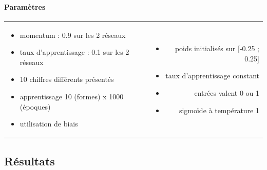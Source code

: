     \paragraph{Paramètres}
      \begin{center}
	\begin{tabular}{lr}
	  \begin{minipage}{230px}
	    \begin{itemize}
	      \item momentum : 0.9 sur les 2 réseaux
	      \item taux d'apprentissage : 0.1 sur les 2 réseaux
	      \item 10 chiffres différents présentés
	      \item apprentissage 10 (formes) x 1000 (époques)
	      \item utilisation de biais
	    \end{itemize}
	  \end{minipage}
	  &
	  \begin{minipage}{230px}
	    \begin{itemize}
	      \item poids initialisés sur [-0.25 ; 0.25]
	      \item taux d'apprentissage constant
	      \item entrées valent 0 ou 1
	      \item sigmoïde à température 1
	    \end{itemize}
	  \end{minipage}
	\end{tabular}
      \end{center}

  
  \newpage
  \subsection{Résultats}
